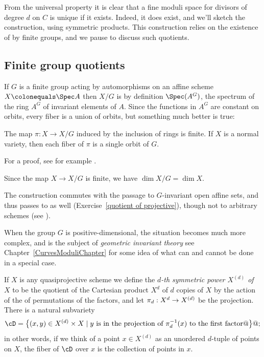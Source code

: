 From the universal property it is clear that a fine moduli space for
divisors of degree $d$ on $C$ is unique if it exists. Indeed, it does
exist, and we'll sketch the construction, using symmetric products.
This construction relies on the existence of 
%
by
finite groups, and we pause to discuss such quotients.

\subsection*{Finite group quotients}

If $G$ is a finite group acting by automorphisms on an affine scheme
%
%
%
%
%
%
$X\colonequals\Spec A$ then $X/G$ is by definition $\Spec(A^G)$, the spectrum of
the ring $A^G$ of invariant elements of $A$. Since the functions in $A^{G}$ 
are constant on orbits, every fiber is a union of orbits, but something much better is true:

\begin{theorem}\label{finite invariant theory}
The map $\pi: X\to X/G$ induced by the inclusion of rings is finite. 
%
If $X$ is a normal variety, then each fiber of $\pi$  is a single orbit of $G$.
\end{theorem}

For a proof, see for example \cite[Proposition 13.10]{Eisenbud1995}.  

Since the map $X\to X/G$ is finite, we have $\dim X/G = \dim X$. 

The construction commutes with the passage to $G$-invariant open
%
affine sets, and thus passes to 
%
as well
(Exercise~\ref{quotient of projective}), though not to arbitrary
schemes (see \cite[Example 5.3.2]{Olsson}). 

When the group $G$ is positive-dimensional, the situation becomes much more complex, and is the subject
%
of 
\emph{geometric invariant theory}
\emdash see Chapter~\ref{CurvesModuliChapter} 
for some  idea of what can and cannot be done
in a special case.

If $X$ is any  quasiprojective scheme we define the 
\emph{$d$-th symmetric power $X^{(d)}$ of $X$} 
%
to be the quotient of the Cartesian product $X^d$ of $d$ copies of $X$
by the action of the 
%
of 
permutations of the factors, and let $\pi_d: X^d\to\nobreak X^{(d)}$ be
the projection. There is a natural
subvariety 
$$
\cD = \bigl\{(x,y) \in X^{(d)} \times X\mid \hbox{$y$ is in the projection of $\pi_d^{-1}(x)$ to the first factor}@\bigr\}@;
$$
in other words, if we think of a point $x \in X^{(d)}$ as an unordered $d$-tuple of points on $X$, the fiber of $\cD$ over $x$ is the collection of points in $x$.

